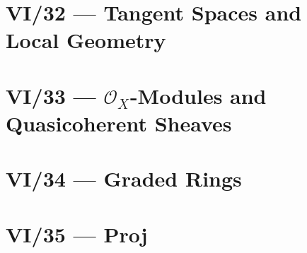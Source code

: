 





\section{VI/32 --- Tangent Spaces and Local Geometry}







\section[VI/33 --- OX-Modules and Quasicoherent Sheaves]{VI/33 --- \texorpdfstring{\(\mathcal O_X\)}{OX}-Modules and Quasicoherent Sheaves}







\section{VI/34 --- Graded Rings}







\section{VI/35 --- Proj}





